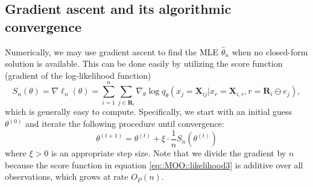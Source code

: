 \documentclass[aos, preprint]{imsart}
\theoremstyle{plain}
\theoremstyle{definition}
\let\hat\widehat
\newcommand{\bX}{\mathbf{X}}
\newcommand{\bR}{\mathbf{R}}
\begin{document}
\subsection{Gradient ascent and its algorithmic convergence}

Numerically, we may use gradient ascent to find the MLE $\hat \theta_n$ when no closed-form solution is available. 
This can be done easily by utilizing the score function (gradient of the log-likelihood function)
\begin{equation}
S_n(\theta) = \nabla\ell_n(\theta)   = \sum_{i=1}^n\sum_{j \in \bR_i} \nabla_\theta \log q_\theta(x_j = \bX_{ij}|x_r = \bX_{i, r},  r=\bR_i\ominus e_j),
\label{eq::MOO::likelihood3}
\end{equation}
which is generally easy to compute.
Specifically, we start with an initial guess $\theta^{(0)}$ and iterate the following procedure until convergence:
\begin{equation}
\theta^{(t+1)} = \theta^{(t)}  + \xi \cdot \frac{1}{n}S_n (\theta^{(t)})
\label{eq::GD}
\end{equation}
where $\xi>0$ is an appropriate step size. Note that we divide the gradient by $n$ because the score function in equation \eqref{eq::MOO::likelihood3}
is additive over all observations, which grows at rate $O_P(n)$.
\end{document}
